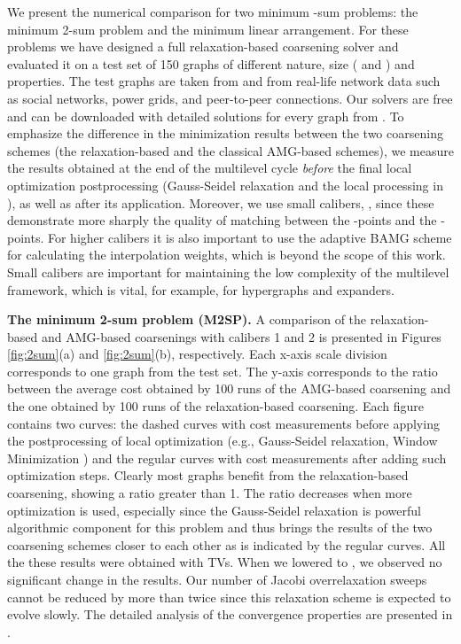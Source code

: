 \documentclass[final]{siamltex}
\begin{document}
\par We present the numerical comparison for two minimum -sum problems: the minimum 2-sum problem and the minimum linear arrangement. For these problems we have designed a full relaxation-based
coarsening solver and evaluated it on a test set of 150 graphs of
different nature, size ( and )
and properties. The test graphs are taken from
\cite{davis} and from real-life network data such as social networks, power grids, and peer-to-peer connections. Our solvers are free and can be downloaded with
detailed solutions for every graph from \cite{safroproj}.
To emphasize the difference in the minimization results
between the two coarsening schemes (the relaxation-based and the classical AMG-based schemes), we measure the results
obtained at the end of the multilevel cycle {\it before} the final local
optimization postprocessing (Gauss-Seidel relaxation and the local processing in \cite{safro2004,safro2003}),
as well as after its application. Moreover, we use small calibers, , since these demonstrate
more sharply the quality of matching between the -points and
the -points. For higher calibers it is also important to use
the adaptive BAMG scheme \cite{amg} for
calculating the interpolation weights, which is beyond the scope
of this work. Small calibers are important for maintaining the
low complexity of the multilevel framework, which is vital, for example, for hypergraphs and expanders.

\par {\bf The minimum 2-sum problem (M2SP).} A comparison of the relaxation-based and AMG-based
coarsenings with calibers 1 and 2 is presented in Figures
\ref{fig:2sum}(a) and \ref{fig:2sum}(b), respectively. Each x-axis
scale division corresponds to one graph from the test set. The
y-axis corresponds to the ratio between the average cost obtained by 100
runs of the AMG-based coarsening and the one obtained by 100 runs of
the relaxation-based coarsening. Each figure contains two curves:
the dashed curves with cost measurements before applying the postprocessing of local optimization (e.g., Gauss-Seidel
relaxation, Window Minimization \cite{safro2004}) and the regular curves with cost measurements
after adding such optimization steps.
Clearly most graphs benefit from
the relaxation-based coarsening, showing a ratio greater than 1. The ratio
decreases when more optimization is used, especially since the
Gauss-Seidel relaxation is powerful algorithmic component for this problem and thus
brings the results of the two coarsening schemes closer to each
other as is indicated by the regular curves. All the these results
were obtained with  TVs. When we lowered  to , we observed no significant change in the results. Our number of
Jacobi overrelaxation sweeps  cannot be reduced by more than twice
since this relaxation scheme is expected to evolve slowly. The detailed analysis of the convergence properties are presented in \cite{chen-safro-algdist-full}.
\end{document}
